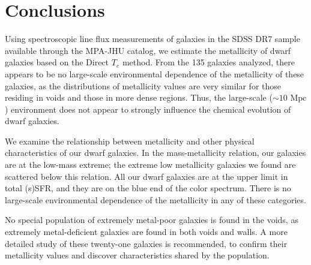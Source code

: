 


\section{Conclusions}
Using spectroscopic line flux measurements of galaxies in the SDSS DR7 sample 
available through the MPA-JHU catalog, we estimate the metallicity of dwarf 
galaxies based on the Direct $T_e$ method.  From the 135 galaxies analyzed, 
there appears to be no large-scale environmental dependence of the metallicity 
of these galaxies, as the distributions of metallicity values are very similar 
for those residing in voids and those in more dense regions.  Thus, the 
large-scale ($\sim 10\text{ Mpc}$) environment does not appear to strongly 
influence the chemical evolution of dwarf galaxies.

We examine the relationship between metallicity and other physical 
characteristics of our dwarf galaxies.  In the mass-metallicity relation, our 
galaxies are at the low-mass extreme; the extreme low metallicity galaxies we 
found are scattered below this relation.  All our dwarf galaxies are at the 
upper limit in total (s)SFR, and they are on the blue end of the color spectrum.  
There is no large-scale environmental dependence of the metallicity in any of 
these categories.

No special population of extremely metal-poor galaxies is found in the voids, as 
extremely metal-deficient galaxies are found in both voids and walls.  A more 
detailed study of these twenty-one galaxies is recommended, to confirm their 
metallicity values and discover characteristics shared by the population.

